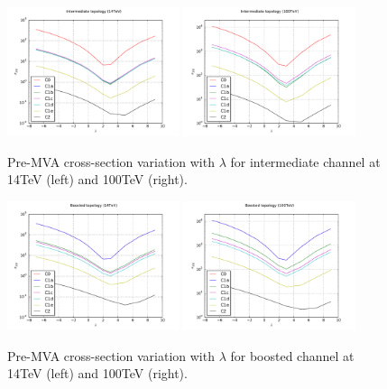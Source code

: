 \documentclass[11pt]{article}
\begin{document}
\begin{figure}[htbp]
\begin{center}
\includegraphics[width=0.45\textwidth]{plots/inter_xSec_14TeV.pdf}
\includegraphics[width=0.45\textwidth]{plots/inter_xSec_100TeV.pdf}
\caption{Pre-MVA cross-section variation with $\lambda$ for intermediate channel at 14TeV (left) and 100TeV (right).}
\label{fig:interXsec}
\end{center}
\end{figure}

\begin{figure}[htbp]
\begin{center}
\includegraphics[width=0.45\textwidth]{plots/boost_xSec_14TeV.pdf}
\includegraphics[width=0.45\textwidth]{plots/boost_xSec_100TeV.pdf}
\caption{Pre-MVA cross-section variation with $\lambda$ for boosted channel at 14TeV (left) and 100TeV (right).}
\label{fig:boostXsec}
\end{center}
\end{figure}
\end{document}
